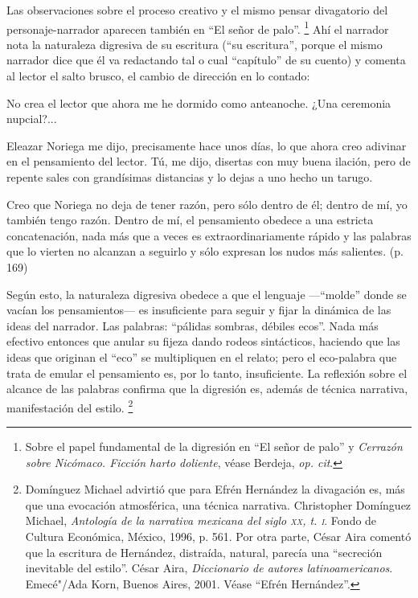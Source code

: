 \documentclass[14pt,twoside,final]{extbook} %
\let\oldfootnote\footnote
\renewcommand\footnote[1]{%
\oldfootnote{\hspace{1mm}#1}}
\begin{document}
Las observaciones sobre el proceso creativo y el mismo pensar divagatorio del personaje-narrador aparecen también en ``El señor de palo''.\footnote{Sobre el papel fundamental de la digresión en ``El señor de palo'' y \emph{Cerrazón sobre Nicómaco. Ficción harto doliente}, véase Berdeja, \emph{op. cit}.} Ahí el narrador nota la naturaleza digresiva de su escritura (``su escritura'', porque el mismo narrador dice que él va redactando tal o cual ``capítulo'' de su cuento) y comenta al lector el salto brusco, el cambio de dirección en lo contado:
\begin{quoting}
No crea el lector que ahora me he dormido como anteanoche. ¿Una ceremonia nupcial?...

Eleazar Noriega me dijo, precisamente hace unos días, lo que ahora creo adivinar en el pensamiento del lector. Tú, me dijo, disertas con muy buena ilación, pero de repente sales con grandísimas distancias y lo dejas a uno hecho un tarugo.

Creo que Noriega no deja de tener razón, pero sólo dentro de él; dentro de mí, yo también tengo razón. Dentro de mí, el pensamiento obedece a una estricta concatenación, nada más que a veces es extraordinariamente rápido y las palabras que lo vierten no alcanzan a seguirlo y sólo expresan los nudos más salientes. (p. 169)
\end{quoting}
Según esto, la naturaleza digresiva obedece a que el lenguaje ---``molde'' donde se vacían los pensamientos--- es insuficiente para seguir y fijar la dinámica de las ideas del narrador. Las palabras: ``pálidas sombras, débiles ecos''. Nada más efectivo entonces que anular su fijeza dando
rodeos sintácticos, haciendo que las ideas que originan el ``eco'' se multipliquen en el relato; pero el eco-palabra que trata de emular el pensamiento es, por lo tanto, insuficiente. La reflexión sobre el alcance de las palabras confirma que la digresión es, además de técnica narrativa, manifestación del estilo.\footnote{Domínguez Michael advirtió que para Efrén Hernández la divagación es, más que una evocación atmosférica, una técnica narrativa. Christopher Domínguez Michael, \emph{Antología de la narrativa mexicana del siglo \textsc{xx}, t. \textsc{i}}. Fondo de Cultura Económica, México, 1996, p. 561. Por otra parte, César Aira comentó que la escritura de Hernández, distraída, natural, parecía una ``secreción inevitable del estilo''. César Aira, \emph{Diccionario de autores latinoamericanos}. Emecé"/Ada Korn, Buenos Aires, 2001. Véase ``Efrén Hernández''.}
\end{document}
